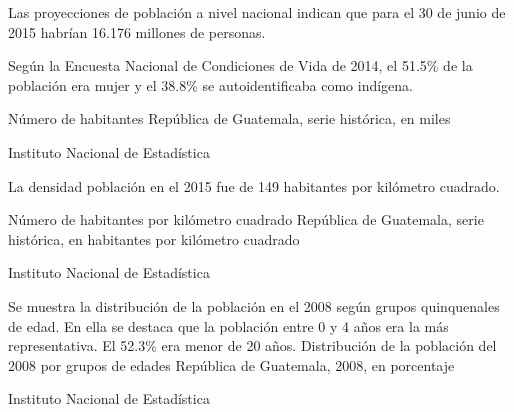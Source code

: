 
{%
Las proyecciones de población a nivel nacional indican que para el 30 de junio de 2015 habrían 16.176 millones de personas.

Según la Encuesta Nacional de Condiciones de Vida de 2014, el 51.5\% de la población era mujer y el 38.8\% se autoidentificaba como indígena. }%
{%
 Número de habitantes} %
{%
 República de Guatemala, serie histórica, en miles} %
{%
 \begin{tikzpicture}[x=1pt,y=1pt]    \end{tikzpicture}}%
{%
 Instituto Nacional de Estadística} %





 {%
La densidad población en el 2015 fue de 149 habitantes por kilómetro cuadrado.

}%
 {%
 	Número de habitantes por kilómetro cuadrado} %
 {%
 	República de Guatemala, serie histórica, en habitantes por kilómetro cuadrado} %
 {%
 	\begin{tikzpicture}[x=1pt,y=1pt]    \end{tikzpicture}}%
 {%
 	Instituto Nacional de Estadística} %
 
 
 
 
 

 {%
 Se muestra la distribución de la población en el 2008 según grupos quinquenales de edad. En ella se destaca que la población entre 0 y 4 años era la más representativa. El 52.3\% era menor de 20 años.
   }%
 {%
 	Distribución de la población del 2008 por grupos de edades} %
 {%
 	República de Guatemala, 2008, en porcentaje} %
 {%
 	\begin{tikzpicture}[x=1pt,y=1pt]    \end{tikzpicture}}%
 {%
 	Instituto Nacional de Estadística} %
 
